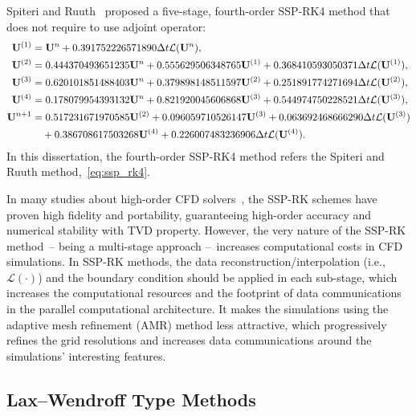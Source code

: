Spiteri and Ruuth~\cite{spiteri2002new} proposed a five-stage, fourth-order SSP-RK4 method that does not require to use adjoint operator:
\begin{equation}\label{eq:ssp_rk4}
    \begin{split}
        \mathbf{U}^{(1)} &= \mathbf{U}^{n} + 0.391752226571890 \Delta t \mathcal{L}(\mathbf{U}^{n}), \\
        \mathbf{U}^{(2)} &= 0.444370493651235 \mathbf{U}^{n} + 0.555629506348765 \mathbf{U}^{(1)} + 0.368410593050371 \Delta t \mathcal{L} (\mathbf{U}^{(1)}), \\
        \mathbf{U}^{(3)} &= 0.620101851488403 \mathbf{U}^{n} + 0.379898148511597 \mathbf{U}^{(2)} + 0.251891774271694 \Delta t \mathcal{L} (\mathbf{U}^{(2)}), \\
        \mathbf{U}^{(4)} &= 0.178079954393132 \mathbf{U}^{n} + 0.821920045606868 \mathbf{U}^{(3)} + 0.544974750228521 \Delta t \mathcal{L} (\mathbf{U}^{(3)}), \\
        \mathbf{U}^{n + 1} &= 0.517231671970585 \mathbf{U}^{(2)} + 0.096059710526147 \mathbf{U}^{(3)} + 0.063692468666290 \Delta t \mathcal{L} (\mathbf{U}^{(3)}) \\
                    &\quad + 0.386708617503268 \mathbf{U}^{(4)} + 0.226007483236906 \Delta t \mathcal{L} (\mathbf{U}^{(4)}).
    \end{split}
\end{equation}
In this dissertation, the fourth-order SSP-RK4 method refers the Spiteri and Ruuth method,~\cref{eq:ssp_rk4}.

In many studies about high-order CFD solvers~\cite{gottlieb1998total,gottlieb2001strong,gottlieb2011strong,mignone2010high,del2003efficient,del2007echo,reyes2018new,reyes2019variable},
the SSP-RK schemes have proven high fidelity and portability, guaranteeing high-order accuracy
and numerical stability with TVD property.
However, the very nature of the SSP-RK method~-- being a multi-stage approach --~increases
computational costs in CFD simulations.
In SSP-RK methods, the data reconstruction/interpolation (i.e., \( \mathcal{L}(\cdot) \)) and the boundary condition
should be applied in each sub-stage, which increases the computational resources
and the footprint of data communications in the parallel computational architecture.
It makes the simulations using the adaptive mesh refinement (AMR) method less attractive,
which progressively refines the grid resolutions
and increases data communications around the simulations’ interesting features.


\subsection{Lax–Wendroff Type Methods}\label{subsec:laxwendroff}


